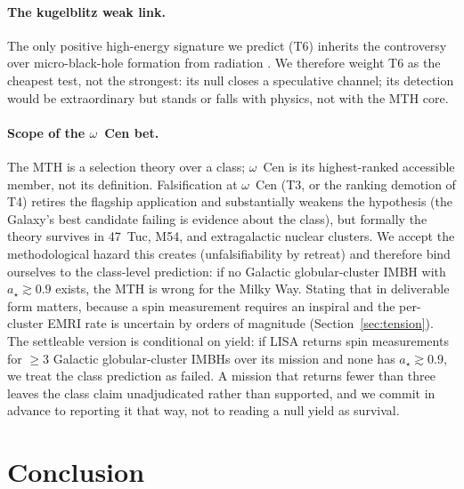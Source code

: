 \documentclass[11pt]{article}
\newcommand{\astar}{\ensuremath{a_\star}}
\begin{document}
\paragraph{The kugelblitz weak link.} The only positive high-energy signature we predict (T6) inherits the controversy over micro-black-hole formation from radiation \citep{AlvarezDominguez2024,Loeb2024Comment}. We therefore weight T6 as the cheapest test, not the strongest: its null closes a speculative channel; its detection would be extraordinary but stands or falls with \citet{Dvali2023} physics, not with the MTH core.

\paragraph{Scope of the $\omega$~Cen bet.} The MTH is a selection theory over a class; $\omega$~Cen is its highest-ranked accessible member, not its definition. Falsification at $\omega$~Cen (T3, or the ranking demotion of T4) retires the flagship application and substantially weakens the hypothesis (the Galaxy's best candidate failing is evidence about the class), but formally the theory survives in 47~Tuc, M54, and extragalactic nuclear clusters. We accept the methodological hazard this creates (unfalsifiability by retreat) and therefore bind ourselves to the class-level prediction: if no Galactic globular-cluster IMBH with $\astar \gtrsim 0.9$ exists, the MTH is wrong for the Milky Way. Stating that in deliverable form matters, because a spin measurement requires an inspiral and the per-cluster EMRI rate is uncertain by orders of magnitude (Section~\ref{sec:tension}). The settleable version is conditional on yield: if LISA returns spin measurements for $\geq$3 Galactic globular-cluster IMBHs over its mission and none has $\astar \gtrsim 0.9$, we treat the class prediction as failed. A mission that returns fewer than three leaves the class claim unadjudicated rather than supported, and we commit in advance to reporting it that way, not to reading a null yield as survival.

\section{Conclusion}
\label{sec:conclusion}
\end{document}
